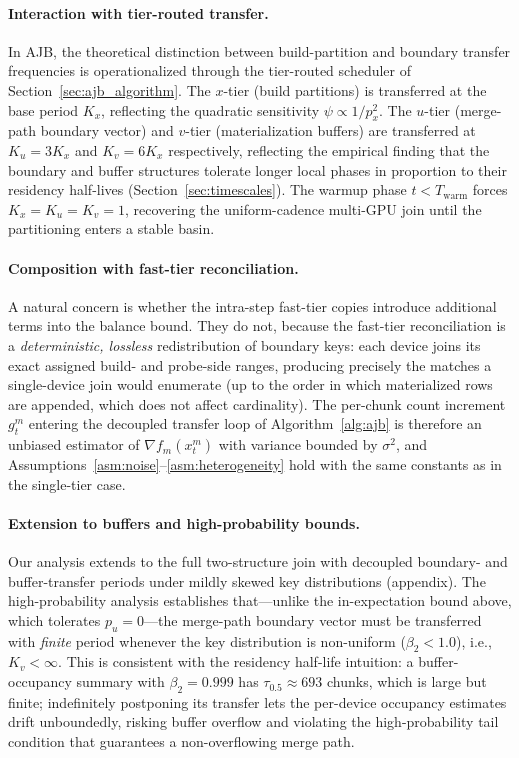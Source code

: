 \documentclass{article}
\begin{document}
\paragraph{Interaction with tier-routed transfer.}
In AJB, the theoretical distinction between build-partition and boundary
transfer frequencies is operationalized through the tier-routed scheduler of
Section~\ref{sec:ajb_algorithm}. The $x$-tier (build partitions) is transferred
at the base period $K_x$, reflecting the quadratic sensitivity
$\psi \propto 1/p_x^2$. The $u$-tier (merge-path boundary vector) and $v$-tier
(materialization buffers) are transferred at $K_u = 3K_x$ and $K_v = 6K_x$
respectively, reflecting the empirical finding that the boundary and buffer
structures tolerate longer local phases in proportion to their residency
half-lives (Section~\ref{sec:timescales}). The warmup phase
$t < T_{\mathrm{warm}}$ forces $K_x = K_u = K_v = 1$, recovering the
uniform-cadence multi-GPU join until the partitioning enters a stable basin.

\paragraph{Composition with fast-tier reconciliation.}
A natural concern is whether the intra-step fast-tier copies introduce
additional terms into the balance bound. They do not, because the fast-tier
reconciliation is a \emph{deterministic, lossless} redistribution of boundary
keys: each device joins its exact assigned build- and probe-side ranges,
producing precisely the matches a single-device join would enumerate (up to the
order in which materialized rows are appended, which does not affect
cardinality). The per-chunk count increment $g_t^m$ entering the decoupled
transfer loop of Algorithm~\ref{alg:ajb} is therefore an unbiased estimator of
$\nabla f_m(x_t^m)$ with variance bounded by $\sigma^2$, and
Assumptions~\ref{asm:noise}--\ref{asm:heterogeneity} hold with the same
constants as in the single-tier case.

\paragraph{Extension to buffers and high-probability bounds.}
Our analysis extends to the full two-structure join with decoupled boundary- and
buffer-transfer periods under mildly skewed key distributions (appendix). The
high-probability analysis establishes that---unlike the in-expectation bound
above, which tolerates $p_u = 0$---the merge-path boundary vector must be
transferred with \emph{finite} period whenever the key distribution is
non-uniform ($\beta_2 < 1.0$), i.e., $K_v < \infty$. This is consistent with the
residency half-life intuition: a buffer-occupancy summary with $\beta_2 = 0.999$
has $\tau_{0.5} \approx 693$ chunks, which is large but finite; indefinitely
postponing its transfer lets the per-device occupancy estimates drift unboundedly,
risking buffer overflow and violating the high-probability tail condition that
guarantees a non-overflowing merge path.
\end{document}
